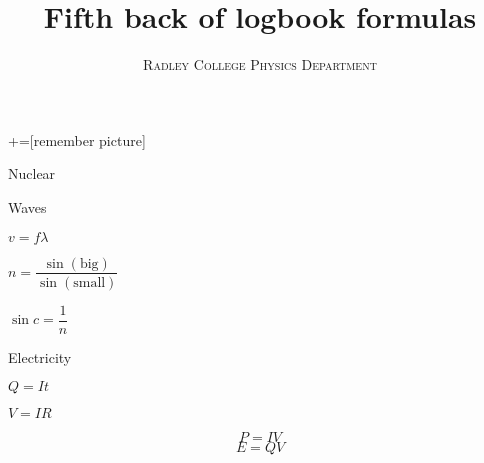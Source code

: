 \documentclass[11pt,a4paper]{article}
\title{Fifth back of logbook formulas}
\author{\textsc{Radley College Physics Department}}
\date{}
\begin{document}

\thispagestyle{empty}

\hfill

+=[remember picture]


\noindent\begin{paracol}{3}
Nuclear
\end{paracol}

\hrulefill

\vspace*{1em}

\noindent\begin{paracol}{4}
Waves
\switchcolumn 
\begin{center}
$v=f\lambda$
\end{center}
\switchcolumn
\begin{center}
$n=\dfrac{\sin\left(\text{big}\right)}{\sin\left(\text{small}\right)}$
\end{center}
\switchcolumn
\begin{center}
$\sin c=\dfrac{1}{n}$
\end{center}
\end{paracol}

\vspace*{1em}

\hrulefill

\vspace*{1em}

\noindent\begin{paracol}{3}
Electricity
\switchcolumn 
\begin{center}
$Q = It$
\end{center}
\switchcolumn
\begin{center}
$V = IR$
\end{center}
\end{paracol}

\noindent\begin{paracol}{3}

\switchcolumn 
\[P=IV\]
\switchcolumn
\[E=QV\]
\end{paracol}

\vspace*{1em}

\hrulefill

\vspace*{1em}
\end{document}
